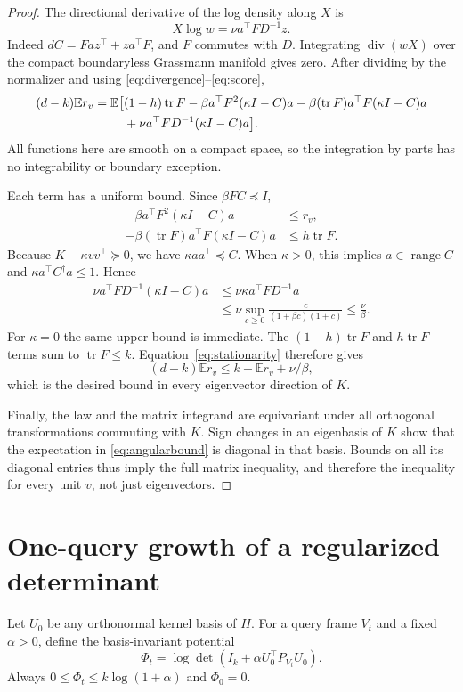 \documentclass[11pt]{article}
\numberwithin{equation}{section}
\theoremstyle{remark}\newtheorem{remark}[theorem]{Remark}
\newcommand{\E}{\mathbb E}
\newcommand{\tr}{\operatorname{tr}}
\newcommand{\range}{\operatorname{range}}
\newcommand{\diver}{\operatorname{div}}
\begin{document}
\begin{proof}
The directional derivative of the log density along $X$ is
\begin{equation}\label{eq:score}
X\log w=\nu a^\top FD^{-1}z.
\end{equation}
Indeed $dC=Faz^\top+za^\top F$, and $F$ commutes with $D$. Integrating $\diver(wX)$ over the compact boundaryless Grassmann manifold gives zero. After dividing by the normalizer and using \eqref{eq:divergence}--\eqref{eq:score},
\begin{align}\label{eq:stationarity}
(d-k)\E r_v
=\E\big[&(1-h)\tr F
-\beta a^\top F^2(\kappa I-C)a
-\beta(\tr F)a^\top F(\kappa I-C)a\notag\\
&+\nu a^\top FD^{-1}(\kappa I-C)a\big].
\end{align}
All functions here are smooth on a compact space, so the integration by parts has no integrability or boundary exception.

Each term has a uniform bound. Since $\beta FC\preceq I$,
\begin{align*}
-\beta a^\top F^2(\kappa I-C)a&\le r_v,\\
-\beta(\tr F)a^\top F(\kappa I-C)a&\le h\tr F.
\end{align*}
Because $K-\kappa vv^\top\succeq0$, we have $\kappa aa^\top\preceq C$. When $\kappa>0$, this implies $a\in\range C$ and $\kappa a^\top C^\dagger a\le1$. Hence
\begin{align*}
\nu a^\top FD^{-1}(\kappa I-C)a
&\le\nu\kappa a^\top FD^{-1}a\\
&\le\nu\sup_{c\ge0}\frac{c}{(1+\beta c)(1+c)}\le\frac\nu\beta.
\end{align*}
For $\kappa=0$ the same upper bound is immediate. The $(1-h)\tr F$ and $h\tr F$ terms sum to $\tr F\le k$. Equation~\eqref{eq:stationarity} therefore gives
\[
(d-k)\E r_v\le k+\E r_v+\nu/\beta,
\]
which is the desired bound in every eigenvector direction of $K$.

Finally, the law and the matrix integrand are equivariant under all orthogonal transformations commuting with $K$. Sign changes in an eigenbasis of $K$ show that the expectation in \eqref{eq:angularbound} is diagonal in that basis. Bounds on all its diagonal entries thus imply the full matrix inequality, and therefore the inequality for every unit $v$, not just eigenvectors.
\end{proof}

\section{One-query growth of a regularized determinant}\label{sec:potential}
Let $U_0$ be any orthonormal kernel basis of $H$. For a query frame $V_t$ and a fixed $\alpha>0$, define the basis-invariant potential
\begin{equation}\label{eq:potential}
\Phi_t=\log\det(I_k+\alpha U_0^\top P_{V_t}U_0).
\end{equation}
Always $0\le\Phi_t\le k\log(1+\alpha)$ and $\Phi_0=0$.
\end{document}
